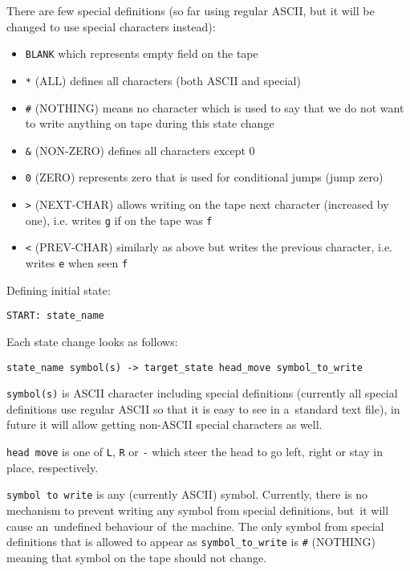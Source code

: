 \documentclass[english,shortabstract,mgr]{iithesis}
\begin{document}
        There are few special definitions (so far using regular ASCII,
but it will be changed to use special characters instead):
\begin{itemize}
  \item \texttt{BLANK} which represents empty field on the tape
  \item \texttt{*} (ALL) defines all characters (both ASCII and special)
  \item \texttt{\#} (NOTHING) means no character which is used to say
                   that we do not want to write anything on tape during
                   this state change
          \item \texttt{\&} (NON-ZERO) defines all characters except 0
          \item \texttt{0} (ZERO) represents zero that is used for conditional jumps
           (jump zero)
          \item \texttt{>} (NEXT-CHAR) allows writing on the tape next character
                   (increased by one), i.e. writes \texttt{g} if on the tape
                   was \texttt{f}
  \item \texttt{<} (PREV-CHAR) similarly as above but writes the previous character,
                   i.e. writes \texttt{e} when seen \texttt{f}
\end{itemize}

Defining initial state:
\begin{verbatim}
START: state_name
\end{verbatim}

Each state change looks as follows:
\begin{verbatim}
state_name symbol(s) -> target_state head_move symbol_to_write
\end{verbatim}

\texttt{symbol(s)} is ASCII character including special definitions (currently
all special definitions use regular ASCII so that it is easy to see
in a~standard text file), in future it will allow getting non-ASCII special
characters as well.

\texttt{head move} is one of \texttt{L}, \texttt{R} or \texttt{-} which
steer the head to go left, right or stay in place, respectively.

\texttt{symbol to write} is any (currently ASCII) symbol. Currently, there
is no mechanism to prevent writing any symbol from special definitions,
but~it will cause an~undefined behaviour of~the machine. The only symbol
from special definitions that is allowed to appear as \texttt{symbol\_to\_write}
is \texttt{\#} (NOTHING) meaning that symbol on the tape should not change.
\end{document}
